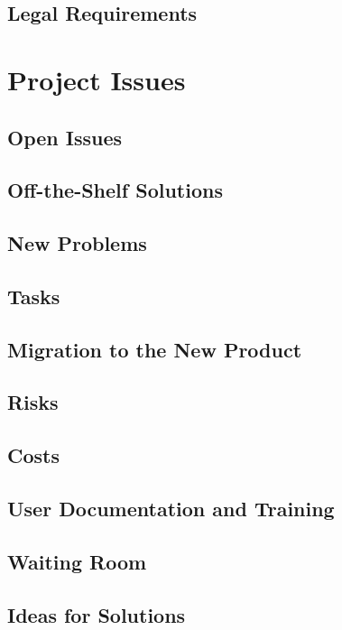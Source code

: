 \documentclass[12pt]{report}
\begin{document}
\section{Legal Requirements}\label{sec:Legal}

\chapter{Project Issues}\label{ch:issues}
\section{Open Issues}\label{sec:issues}
\section{Off-the-Shelf Solutions}\label{sec:solutions}
\section{New Problems}\label{sec:NewProblems}
\section{Tasks}\label{sec:Tasks}
\section{Migration to the New Product}\label{sec:Migration}
\section{Risks}\label{sec:Risks}
\section{Costs}\label{sec:Costs}
\section{User Documentation and Training}\label{sec:UserDoc}
\section{Waiting Room}\label{sec:Waiting}
\section{Ideas for Solutions}\label{sec:Solutions}
\end{document}
